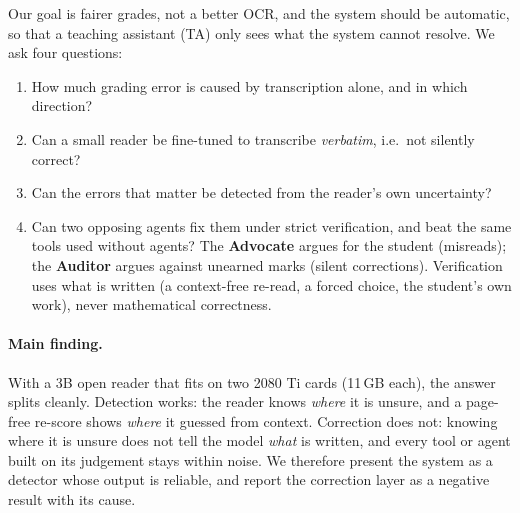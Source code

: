 \documentclass[11pt]{article}
\begin{document}
Our goal is fairer grades, not a better OCR, and the system should be automatic, so that a teaching assistant (TA) only sees what the system cannot resolve. We ask four questions:
\begin{enumerate}
  \item How much grading error is caused by transcription alone, and in which direction?
  \item Can a small reader be fine-tuned to transcribe \emph{verbatim}, i.e.\ not silently correct?
  \item Can the errors that matter be detected from the reader's own uncertainty?
  \item Can two opposing agents fix them under strict verification, and beat the same tools used without agents? The \textbf{Advocate} argues for the student (misreads); the \textbf{Auditor} argues against unearned marks (silent corrections). Verification uses what is written (a context-free re-read, a forced choice, the student's own work), never mathematical correctness.
\end{enumerate}

\paragraph{Main finding.} With a 3B open reader that fits on two 2080 Ti cards (11\,GB each), the answer splits cleanly. Detection works: the reader knows \emph{where} it is unsure, and a page-free re-score shows \emph{where} it guessed from context. Correction does not: knowing where it is unsure does not tell the model \emph{what} is written, and every tool or agent built on its judgement stays within noise. We therefore present the system as a detector whose output is reliable, and report the correction layer as a negative result with its cause.
\end{document}
